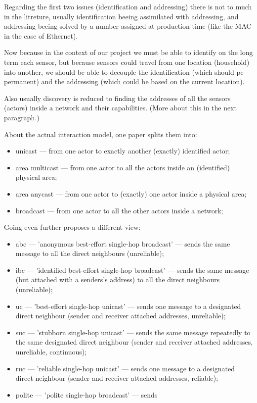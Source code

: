 Regarding the first two issues (identification and addressing) there is not to much in the litreture, usually identification beeing assimilated with addressing, and addressing beeing solved by a number assigned at production time (like the MAC in the case of Ethernet).

Now because in the context of our project we must be able to identify on the long term each sensor, but because sensors could travel from one location (household) into another, we should be able to decouple the identification (which should pe permanent) and the addressing (which could be based on the current location).

Also usually discovery is reduced to finding the addresses of all the sensors (actors) inside a network and their capabilities. (More about this in the next paragraph.)

About the actual interaction model, one paper \cite{Shi2004} splits them into:

\begin{itemize}
	\item unicast --- from one actor to exactly another (exactly) identified actor;
	\item area multicast --- from one actor to all the actors inside an (identified) physical area;
	\item area anycast --- from one actor to (exactly) one actor inside a physical area;
	\item broadcast --- from one actor to all the other actors inside a network;
\end{itemize}

Going even further \cite{He2007} proposes a different view:

\begin{itemize}
	\item abc --- 'anonymous best-effort single-hop broadcast' --- sends the same message to all the direct neighbours (unreliable);
	\item ibc --- 'identified best-effort single-hop broadcast' --- sends the same message (but attached with a senders's address) to all the direct neighbours (unreliable);
	\item uc --- 'best-effort single-hop unicast' --- sends one message to a designated direct neighbour (sender and receiver attached addresses, unreliable);
	\item suc --- 'stubborn single-hop unicast' --- sends the same message repeatedly to the same designated direct neighbour (sender and receiver attached addresses, unreliable, continuous);
	\item ruc --- 'reliable single-hop unicast' --- sends one message to a designated direct neighbour (sender and receiver attached addresses, reliable);
	\item polite --- 'polite single-hop broadcast' --- sends 
\end{itemize}

